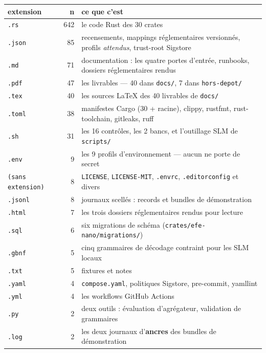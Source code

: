 \documentclass[10pt]{report}
\newcommand{\code}[1]{\texttt{\small #1}}
\begin{document}
\begin{longtable}{@{}lr p{10.6cm}@{}}
\toprule \textbf{extension} & \textbf{n} & \textbf{ce que c'est} \\ \midrule \endhead
\code{.rs} & 642 & \footnotesize le code Rust des 30 crates \\
\code{.json} & 85 & \footnotesize recensements, mappings réglementaires versionnés, profils \emph{attendus}, trust-root Sigstore \\
\code{.md} & 71 & \footnotesize documentation : les quatre portes d'entrée, runbooks, dossiers réglementaires rendus \\
\code{.pdf} & 47 & \footnotesize les livrables --- 40 dans \code{docs/}, 7 dans \code{hors-depot/} \\
\code{.tex} & 40 & \footnotesize les sources LaTeX des 40 livrables de \code{docs/} \\
\code{.toml} & 38 & \footnotesize manifestes Cargo (30 + racine), clippy, rustfmt, rust-toolchain, gitleaks, ruff \\
\code{.sh} & 31 & \footnotesize les 16 contrôles, les 2 bancs, et l'outillage SLM de \code{scripts/} \\
\code{.env} & 9 & \footnotesize les 9 profils d'environnement --- aucun ne porte de secret \\
\code{(sans extension)} & 8 & \footnotesize \code{LICENSE}, \code{LICENSE-MIT}, \code{.envrc}, \code{.editorconfig} et divers \\
\code{.jsonl} & 8 & \footnotesize journaux scellés : records et bundles de démonstration \\
\code{.html} & 7 & \footnotesize les trois dossiers réglementaires rendus pour lecture \\
\code{.sql} & 6 & \footnotesize six migrations de schéma (\code{crates/efe-nano/migrations/}) \\
\code{.gbnf} & 5 & \footnotesize cinq grammaires de décodage contraint pour les SLM locaux \\
\code{.txt} & 5 & \footnotesize fixtures et notes \\
\code{.yaml} & 4 & \footnotesize \code{compose.yaml}, politiques Sigstore, pre-commit, yamllint \\
\code{.yml} & 4 & \footnotesize les workflows GitHub Actions \\
\code{.py} & 2 & \footnotesize deux outils : évaluation d'agrégateur, validation de grammaires \\
\code{.log} & 2 & \footnotesize les deux journaux d'\textbf{ancres} des bundles de démonstration \\

\end{longtable}
\end{document}
